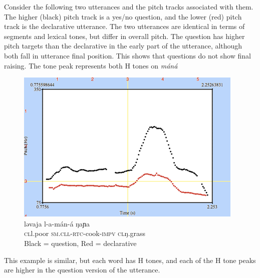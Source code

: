 Consider the following two utterances and the pitch tracks associated with them. The higher (black) pitch track is a yes/no question, and the lower (red) pitch track is the declarative utterance. The two utterances are identical in terms of segments and lexical tones, but differ in overall pitch. The question has higher pitch targets than the declarative in the early part of the utterance, although both fall in utterance final position. This shows that questions do not show final raising. The tone peak represents both H tones on \textit{máná}

\begin{figure}
  \includegraphics[width=\linewidth]{figures/fig-ch4-4.png}
  \caption{\gll ləvaja     l-a-mán-á                       ŋaɲa\\
\textsc{cl}l.poor \textsc{sm.cll}-\textsc{rtc}-cook-\textsc{impv} \textsc{cl}ŋ.grass\\
\trans Black = question, Red = declarative}
  \label{fig:4-4}
\end{figure}

This example is similar, but each word has H tones, and each of the H tone peaks are higher in the question version of the utterance.

